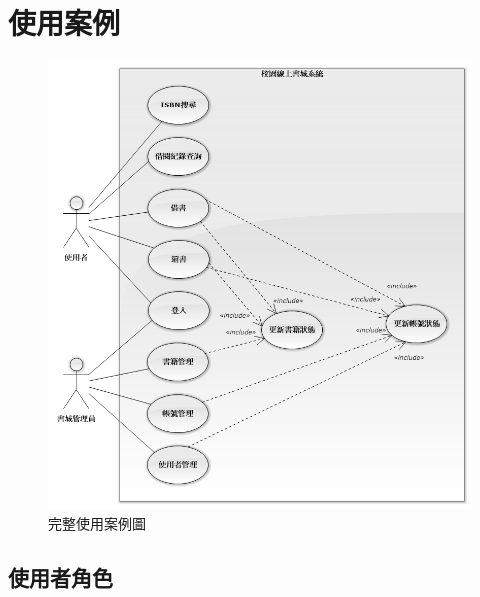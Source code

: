 \chapter{使用案例}

\begin{figure}[ht]
    \centering
    \includegraphics[width=\linewidth]{image/使用案例.png}
    \captionsetup{justification=centering}
    \caption{完整使用案例圖}
\end{figure}

\clearpage

\section{使用者角色}

